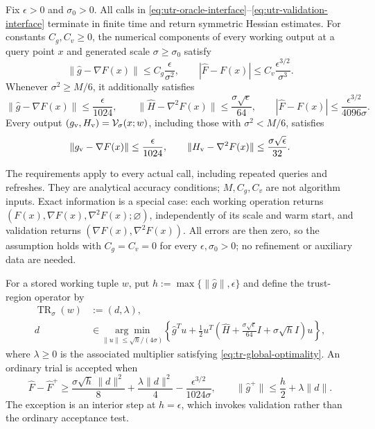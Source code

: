 \documentclass{article}
\begin{document}
\begin{assumption}
\label{ass:inexact-oracle}
Fix $\epsilon>0$ and $\sigma_0>0$.  All calls in
\eqref{eq:utr-oracle-interface}--\eqref{eq:utr-validation-interface}
terminate in finite time and return symmetric Hessian estimates.
For constants $C_g,C_v\ge0$, the numerical components of every
working output at a query point $x$ and generated scale
$\sigma\ge\sigma_0$ satisfy
\begin{equation}\label{eq:utr-working-errors}
 \|\widehat g-\nabla F(x)\|\le C_g\frac{\epsilon}{\sigma^2},
 \qquad
 |\widehat F-F(x)|\le C_v\frac{\epsilon^{3/2}}{\sigma^3}.
\end{equation}
Whenever $\sigma^2\ge M/6$, it additionally satisfies
\begin{equation}\label{eq:utr-safe-errors}
 \|\widehat g-\nabla F(x)\|\le\frac{\epsilon}{1024},\qquad
 \|\widehat H-\nabla^2F(x)\|\le\frac{\sigma\sqrt\epsilon}{64},
 \qquad
 |\widehat F-F(x)|\le\frac{\epsilon^{3/2}}{4096\sigma}.
\end{equation}
Every output $(g_{\rm v},H_{\rm v})=\mathcal V_\sigma(x;w)$,
including those with $\sigma^2<M/6$, satisfies
\begin{equation}\label{eq:utr-validation-errors}
 \|g_{\rm v}-\nabla F(x)\|\le\frac{\epsilon}{1024},\qquad
 \|H_{\rm v}-\nabla^2F(x)\|\le\frac{\sigma\sqrt\epsilon}{32}.
\end{equation}
\end{assumption}

The requirements apply to every actual call, including repeated
queries and refreshes.  They are analytical accuracy conditions;
$M,C_g,C_v$ are not algorithm inputs.  Exact information is a special
case: each working operation returns
$(F(x),\nabla F(x),\nabla^2F(x);\varnothing)$, independently of its
scale and warm start, and validation returns
$(\nabla F(x),\nabla^2F(x))$.  All errors are then zero, so the
assumption holds with $C_g=C_v=0$ for every $\epsilon,\sigma_0>0$;
no refinement or auxiliary data are needed.

For a stored working tuple $w$, put
$h:=\max\{\|\widehat g\|,\epsilon\}$ and define the trust-region
operator by
\begin{equation}\label{eq:adaptive-subproblem}
\begin{aligned}
 \operatorname{TR}_\sigma(w)&:=(d,\lambda),\\
 d&\in\underset{\|u\|\le\sqrt h/(4\sigma)}{\arg\min}
 \left\{\widehat g^Tu+\frac12u^T
 \left(\widehat H+\frac{\sigma\sqrt\epsilon}{64}I
                    +\sigma\sqrt h I\right)u\right\},
\end{aligned}
\end{equation}
where $\lambda\ge0$ is the associated multiplier satisfying
\eqref{eq:tr-global-optimality}.
An ordinary trial is accepted when
\begin{equation}\label{eq:acceptance}
 \widehat F-\widehat F^+
 \ge\frac{\sigma\sqrt h\,\|d\|^2}{8}
    +\frac{\lambda\|d\|^2}{4}
    -\frac{\epsilon^{3/2}}{1024\sigma},
 \qquad
 \|\widehat g^+\|\le\frac h2+\lambda\|d\|.
\end{equation}
The exception is an interior step at $h=\epsilon$, which invokes
validation rather than the ordinary acceptance test.
\end{document}
